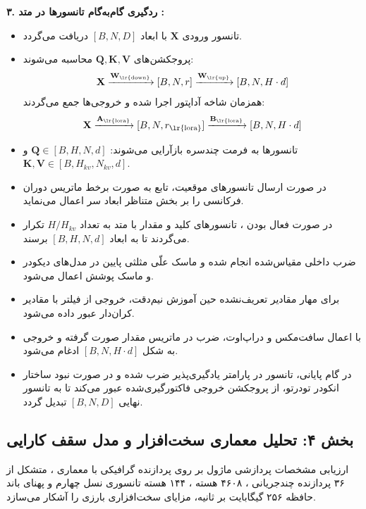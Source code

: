 \textbf{۳. ردگیری گام‌به‌گام تانسورها در متد :}
\begin{itemize}
    \item تانسور ورودی $\mathbf{X}$ با ابعاد $[B, N, D]$ دریافت می‌گردد.
    \item پروجکشن‌های $\mathbf{Q}, \mathbf{K}, \mathbf{V}$ محاسبه می‌شوند:
    \[
    \mathbf{X} \xrightarrow{\mathbf{W}_{\text{\lr{down}}}} [B, N, r] \xrightarrow{\mathbf{W}_{\text{\lr{up}}}} [B, N, H \cdot d]
    \]
    همزمان شاخه آداپتور اجرا شده و خروجی‌ها جمع می‌گردند:
    \[
    \mathbf{X} \xrightarrow{\mathbf{A}_{\text{\lr{lora}}}} [B, N, r_{\text{\lr{lora}}}] \xrightarrow{\mathbf{B}_{\text{\lr{lora}}}} [B, N, H \cdot d]
    \]
    \item تانسورها به فرمت چندسره بازآرایی می‌شوند: $\mathbf{Q} \in [B, H, N, d]$ و $\mathbf{K}, \mathbf{V} \in [B, H_{kv}, N_{kv}, d]$.
    \item در صورت ارسال تانسورهای موقعیت، تابع  به صورت برخط ماتریس دوران فرکانسی را بر بخش متناظر ابعاد سر اعمال می‌نماید.
    \item در صورت فعال بودن ، تانسورهای کلید و مقدار با متد  به تعداد $H / H_{kv}$ تکرار می‌گردند تا به ابعاد $[B, H, N, d]$ برسند.
    \item ضرب داخلی مقیاس‌شده انجام شده و ماسک علّی مثلثی پایین  در مدل‌های دیکودر و ماسک پوشش  اعمال می‌شود.
    \item برای مهار مقادیر تعریف‌نشده حین آموزش نیم‌دقت، خروجی از فیلتر  با مقادیر کران‌دار عبور داده می‌شود.
    \item با اعمال سافت‌مکس و دراپ‌اوت، ضرب در ماتریس مقدار صورت گرفته و خروجی به شکل $[B, N, H \cdot d]$ ادغام می‌شود.
    \item در گام پایانی، تانسور در پارامتر یادگیری‌پذیر  ضرب شده و در صورت نبود ساختار انکودر تودرتو، از پروجکشن خروجی فاکتورگیری‌شده عبور می‌کند تا به تانسور نهایی $[B, N, D]$ تبدیل گردد.
\end{itemize}

\subsection*{بخش ۴: تحلیل معماری سخت‌افزار و مدل سقف کارایی }
ارزیابی مشخصات پردازشی ماژول بر روی پردازنده گرافیکی  با معماری ، متشکل از ۳۶ پردازنده چندجریانی ، ۴۶۰۸ هسته ، ۱۴۴ هسته تانسوری نسل چهارم و پهنای باند حافظه ۲۵۶ گیگابایت بر ثانیه، مزایای سخت‌افزاری بارزی را آشکار می‌سازد.

